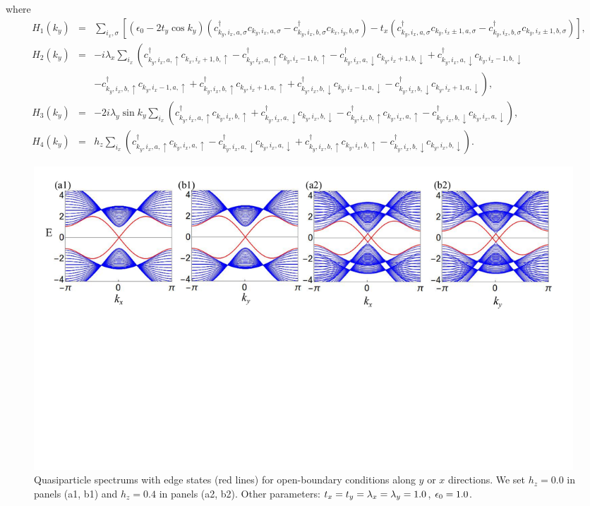 \documentclass[twocolumn,prl,floatfix,citeautoscript,nofootinbib,superscriptaddress]{revtex4}
\begin{document}
where%
\begin{eqnarray*}
H_{1}\left( k_{y}\right) &=&\sum_{i_{x},\sigma }\left[ \left( \epsilon
_{0}-2t_{y}\cos k_{y}\right) \left( c_{k_{y},i_{x},a,\sigma }^{\dagger
}c_{k_{y},i_{x},a,\sigma }-c_{k_{y},i_{x},b,\sigma }^{\dagger
}c_{k_{x},i_{y},b,\sigma }\right) -t_{x}\left( c_{k_{y},i_{x},a,\sigma
}^{\dagger }c_{k_{y},i_{x}\pm 1,a,\sigma }-c_{k_{y},i_{x},b,\sigma
}^{\dagger }c_{k_{y},i_{x}\pm 1,b,\sigma }\right) \right] , \\
H_{2}\left( k_{y}\right) &=&-i\lambda _{x}\sum_{i_{x}}\left(
c_{k_{y},i_{x},a,\uparrow }^{\dagger }c_{k_{x},i_{x}+1,b,\uparrow
}-c_{k_{y},i_{x},a,\uparrow }^{\dagger }c_{k_{y},i_{x}-1,b,\uparrow
}-c_{k_{y},i_{x},a,\downarrow }^{\dagger }c_{k_{y},i_{x}+1,b,\downarrow
}+c_{k_{y},i_{x},a,\downarrow }^{\dagger }c_{k_{y},i_{x}-1,b,\downarrow
}\right. \\
&&\left. -c_{k_{y},i_{x},b,\uparrow }^{\dagger }c_{k_{y},i_{x}-1,a,\uparrow
}+c_{k_{y},i_{x},b,\uparrow }^{\dagger }c_{k_{y},i_{x}+1,a,\uparrow
}+c_{k_{y},i_{x},b,\downarrow }^{\dagger }c_{k_{y},i_{x}-1,a,\downarrow
}-c_{k_{y},i_{x},b,\downarrow }^{\dagger }c_{k_{y},i_{x}+1,a,\downarrow
}\right) , \\
H_{3}\left( k_{y}\right) &=&-2i\lambda _{y}\sin k_{y}\sum_{i_{x}}\left(
c_{k_{y},i_{x},a,\uparrow }^{\dagger }c_{k_{y},i_{x},b,\uparrow
}+c_{k_{y},i_{x},a,\downarrow }^{\dagger }c_{k_{y},i_{x},b,\downarrow
}-c_{k_{y},i_{x},b,\uparrow }^{\dagger }c_{k_{y},i_{x},a,\uparrow
}-c_{k_{y},i_{x},b,\downarrow }^{\dagger }c_{k_{y},i_{x},a,\downarrow
}\right) , \\
H_{4}\left( k_{y}\right) &=&h_{z}\sum_{i_{x}}\left(
c_{k_{y},i_{x},a,\uparrow }^{\dagger }c_{k_{y},i_{x},a,\uparrow
}-c_{k_{y},i_{x},a,\downarrow }^{\dagger }c_{k_{y},i_{x},a,\downarrow
}+c_{k_{y},i_{x},b,\uparrow }^{\dagger }c_{k_{y},i_{x},b,\uparrow
}-c_{k_{y},i_{x},b,\downarrow }^{\dagger }c_{k_{y},i_{x},b,\downarrow
}\right) .
\end{eqnarray*}

\begin{figure}[t]
\centering\includegraphics[width=0.98\textwidth]{FigS3.pdf}
\caption{Quasiparticle spectrums with edge states (red lines) for
open-boundary conditions along $y$ or $x$ directions. We set $h_{z}=0.0$ in
panels (a1, b1) and $h_{z}=0.4$ in panels (a2, b2). Other parameters: $%
t_{x}=t_{y}=\protect\lambda _{x}=\protect\lambda _{y}=1.0$, $\protect%
\epsilon _{0}=1.0$.}
\label{FigS3}
\end{figure}
\end{document}
